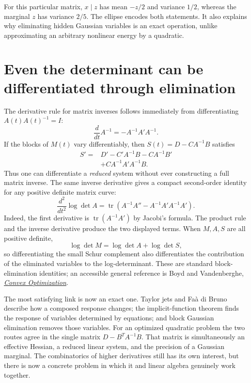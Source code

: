 For this particular matrix, $x\mid z$ has mean $-z/2$ and variance $1/2$, whereas the marginal $z$ has variance $2/5$. The ellipse encodes both statements. It also explains why eliminating hidden Gaussian variables is an exact operation, unlike approximating an arbitrary nonlinear energy by a quadratic.

\section{Even the determinant can be differentiated through elimination}

The derivative rule for matrix inverses follows immediately from differentiating $A(t)A(t)^{-1}=I$:
\[
 \boxed{\frac d{dt}A^{-1}=-A^{-1}A'A^{-1}.}
\]
If the blocks of $M(t)$ vary differentiably, then $S(t)=D-CA^{-1}B$ satisfies
\[
 \begin{aligned}
 S'={}&D'-C'A^{-1}B-CA^{-1}B'\\
     &+CA^{-1}A'A^{-1}B.
 \end{aligned}
\]
Thus one can differentiate a \emph{reduced} system without ever constructing a full matrix inverse. The same inverse derivative gives a compact second-order identity for any positive definite matrix curve:
\[
 \boxed{\frac{d^2}{dt^2}\log\det A
 =\operatorname{tr}\!\left(A^{-1}A''
           -A^{-1}A'A^{-1}A'\right).}
\]
Indeed, the first derivative is $\operatorname{tr}(A^{-1}A')$ by Jacobi's formula. The product rule and the inverse derivative produce the two displayed terms. When $M,A,S$ are all positive definite,
\[
 \log\det M=\log\det A+\log\det S,
\]
so differentiating the small Schur complement also differentiates the contribution of the eliminated variables to the log-determinant. These are standard block-elimination identities; an accessible general reference is Boyd and Vandenberghe, \href{https://www.stanford.edu/~boyd/cvxbook/bv_cvxbook.pdf}{\emph{Convex Optimization}}.

The most satisfying link is now an exact one. Taylor jets and Fa\`a di Bruno describe how a composed response changes; the implicit-function theorem finds the response of variables determined by equations; and block Gaussian elimination removes those variables. For an optimized quadratic problem the two routes agree in the single matrix $D-B^TA^{-1}B$. That matrix is simultaneously an effective Hessian, a reduced linear system, and the precision of a Gaussian marginal. The combinatorics of higher derivatives still has its own interest, but there is now a concrete problem in which it and linear algebra genuinely work together.
